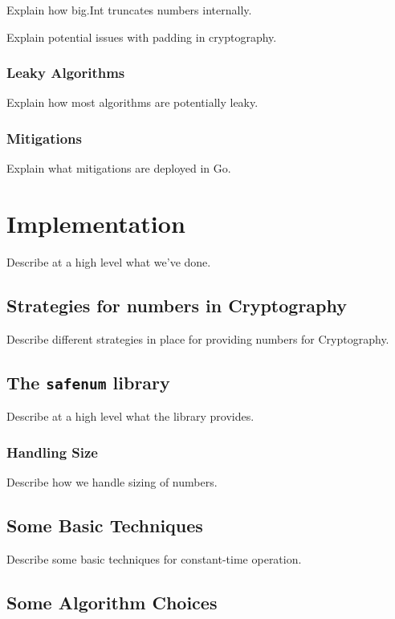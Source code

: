\documentclass[11pt, a4paper, twocolumn]{article} %
\begin{document}
{Explain how big.Int truncates numbers internally.

Explain potential issues with padding in cryptography.

\subsubsection{Leaky Algorithms}

Explain how most algorithms are potentially leaky.

\subsubsection{Mitigations}

Explain what mitigations are deployed in Go.

\section{Implementation}

Describe at a high level what we've done.

\subsection{Strategies for numbers in Cryptography}

Describe different strategies in place for providing numbers for
Cryptography.

\subsection{The \texttt{safenum} library}

Describe at a high level what the library provides.

\subsubsection{Handling Size}

Describe how we handle sizing of numbers.

\subsection{Some Basic Techniques}

Describe some basic techniques for constant-time operation.

\subsection{Some Algorithm Choices}

}
\end{document}
